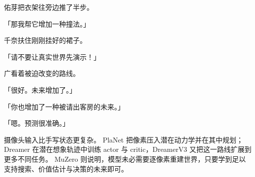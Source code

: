 佑芽把衣架往旁边推了半步。

「那我帮它增加一种撞法。」

千奈扶住刚刚挂好的裙子。

「请不要让真实世界先演示！」

广看着被迫改变的路线。

「很好。未来增加了。」

「你也增加了一种被请出客房的未来。」

「嗯。预测很准确。」

摄像头输入比手写状态更复杂。
PlaNet 把像素压入潜在动力学并在其中规划\cite{hafner2019planet}；Dreamer 在潜在想象轨迹中训练 actor 与 critic\cite{hafner2019dreamer}，DreamerV3 又把这一路线扩展到更多不同任务\cite{hafner2023dreamerv3}。
MuZero 则说明，模型未必需要逐像素重建世界，只要学到足以支持搜索、价值估计与决策的未来即可\cite{schrittwieser2020muzero}。

